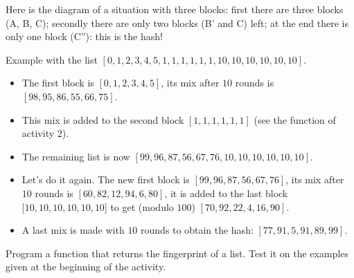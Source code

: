\documentclass[11pt,class=report,crop=false]{standalone}
\begin{document}
\begin{activite}
\begin{enumerate}
 
Here is the diagram of a situation with three blocks: first there are three blocks (A, B, C); secondly there are only two blocks (B' and C) left; at the end there is only one block (C''): this is the hash!
  
  
  Example with the list $[0,1,2,3,4,5,1,1,1,1,1,1,10,10,10,10,10,10]$.
  \begin{itemize}
    \item The first block is $[0,1,2,3,4,5]$, its mix after $10$ rounds is    $[98, 95, 86, 55, 66, 75]$. 
    \item This mix is added to the second block $[1,1,1,1,1,1]$ (see the  function of activity 2).
    \item The remaining list is now $[99,96,87,56,67,76,10,10,10,10,10,10]$.
    \item Let's do it again. The new first block is $[99,96,87,56,67,76]$, its mix after $10$ rounds is $[60, 82, 12, 94, 6, 80]$, it is added to the last block $[10,10,10,10,10,10$] to get (modulo $100$) $[70,92,22,4,16,90]$.
    \item A last mix is made with $10$ rounds to obtain the hash: $[77, 91, 5, 91, 89, 99]$.
   \end{itemize}
   
   Program a  function that returns the fingerprint of a list. Test it on the examples given at the beginning of the activity.
\end{enumerate}   
     
\end{activite}



\end{document}
